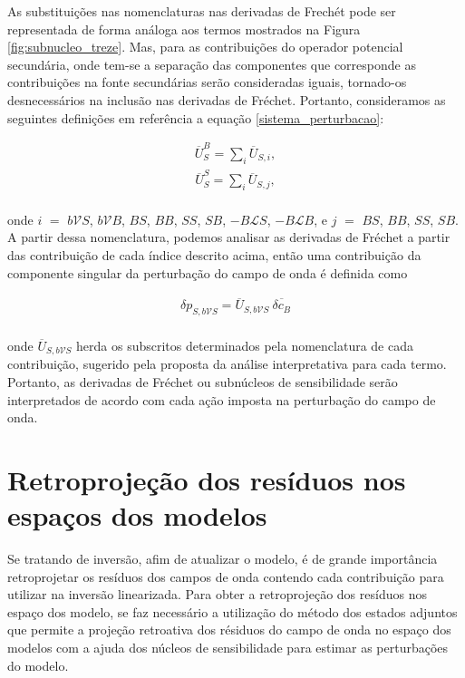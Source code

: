 As substituições nas nomenclaturas nas derivadas de Frechét pode ser representada de forma análoga aos termos mostrados na Figura \ref{fig:subnucleo_treze}. Mas, para as contribuições do operador potencial secundária, onde tem-se a separação das componentes que corresponde as contribuições na fonte secundárias serão consideradas iguais, tornado-os desnecessários na inclusão nas derivadas de Fréchet.  Portanto, consideramos as seguintes definições em referência a equação \ref{sistema_perturbacao}:

\begin{eqnarray}
 \overline{U}^{B}_{S} = \sum_{i} \overline{U}_{S,i},
\end{eqnarray}
\begin{eqnarray}
 \overline{U}^{S}_{S} = \sum_{i} \overline{U}_{S,j},
\end{eqnarray}
\\
onde $i$ $=$ $b\mathcal{V}S$, $b\mathcal{V}B$, $BS$, $BB$, $SS$, $SB$, $−B
\mathcal{L}S$, $−B\mathcal{L}B$, e $j$ $=$ $BS$, $BB$, $SS$, $SB$. A partir dessa nomenclatura, podemos analisar as derivadas de Fréchet a partir das contribuição de cada índice descrito acima, então uma contribuição da componente singular da perturbação do campo de onda é definida como

\begin{eqnarray}
 \delta p_{S,b\mathcal{V}S} = \overline{U}_{S,b\mathcal{V}S}~\overline{\delta c_{B}} 
\end{eqnarray}
\\
onde $\overline{U}_{S,b\mathcal{V}S}$ herda os subscritos determinados pela nomenclatura de cada contribuição, sugerido pela proposta da análise interpretativa para cada termo. Portanto, as derivadas de Fréchet ou subnúcleos de sensibilidade serão interpretados de acordo com cada ação imposta na perturbação do campo de onda.


\section{Retroprojeção dos resíduos nos espaços dos modelos}  

Se tratando de inversão, afim de atualizar o modelo, é de grande importância retroprojetar os resíduos dos campos de onda contendo cada contribuição para utilizar na inversão linearizada. Para obter a retroprojeção dos resíduos nos espaço dos modelo, se faz necessário a utilização do método dos estados adjuntos \citep{fichtner_2011, plessix_2006,fichtner_full_2011,virieux_overview_2009}  que  permite a projeção retroativa dos résiduos do campo de onda no espaço dos modelos com a ajuda dos núcleos de sensibilidade para estimar as perturbações do modelo. \\

